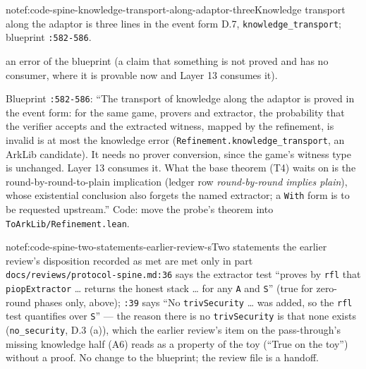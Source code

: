 \begin{finding}{note}{f:code-spine-knowledge-transport-along-adaptor-three}{Knowledge transport along the adaptor is three lines in the event form}
D.7, \texttt{knowledge\_\allowbreak{}transport}; blueprint \texttt{:582-{}586}.

an error of the blueprint (a claim that something is not proved and has no consumer, where it is provable now and Layer 13 consumes it).

Blueprint \texttt{:582-{}586}: \enquote{The transport of knowledge along the adaptor is proved in the event form: for the same game, provers and extractor, the probability that the verifier accepts and the extracted witness, mapped by the refinement, is invalid is at most the knowledge error (\texttt{R\allowbreak{}e\allowbreak{}f\allowbreak{}i\allowbreak{}n\allowbreak{}e\allowbreak{}m\allowbreak{}e\allowbreak{}n\allowbreak{}t\allowbreak{}.\allowbreak{}k\allowbreak{}n\allowbreak{}o\allowbreak{}w\allowbreak{}l\allowbreak{}e\allowbreak{}d\allowbreak{}g\allowbreak{}e\allowbreak{}\_\allowbreak{}t\allowbreak{}r\allowbreak{}a\allowbreak{}n\allowbreak{}s\allowbreak{}p\allowbreak{}o\allowbreak{}r\allowbreak{}t}, an ArkLib candidate). It needs no prover conversion, since the game's witness type is unchanged. Layer 13 consumes it. What the base theorem (T4) waits on is the round-by-round-to-plain implication (ledger row \emph{round-by-round implies plain}), whose existential conclusion also forgets the named extractor; a \texttt{With} form is to be requested upstream.} Code: move the probe's theorem into \texttt{ToArkLib/\allowbreak{}Refinement.\allowbreak{}lean}.

\end{finding}

\begin{finding}{note}{f:code-spine-two-statements-earlier-review-s}{Two statements the earlier review's disposition recorded as met are met only in part}
\texttt{d\allowbreak{}o\allowbreak{}c\allowbreak{}s\allowbreak{}/\allowbreak{}r\allowbreak{}e\allowbreak{}v\allowbreak{}i\allowbreak{}e\allowbreak{}w\allowbreak{}s\allowbreak{}/\allowbreak{}p\allowbreak{}r\allowbreak{}o\allowbreak{}t\allowbreak{}o\allowbreak{}c\allowbreak{}o\allowbreak{}l\allowbreak{}-{}\allowbreak{}s\allowbreak{}p\allowbreak{}i\allowbreak{}n\allowbreak{}e\allowbreak{}.\allowbreak{}m\allowbreak{}d\allowbreak{}:\allowbreak{}3\allowbreak{}6} says the extractor test \enquote{proves by \texttt{rfl} that \texttt{piopExtractor} … returns the honest stack … for any \texttt{A} and \texttt{S}} (true for zero-round phases only, above); \texttt{:39} says \enquote{No \texttt{trivSecurity} … was added, so the \texttt{rfl} test quantifies over \texttt{S}} — the reason there is no \texttt{trivSecurity} is that none exists (\texttt{no\_\allowbreak{}security}, D.3 (a)), which the earlier review's item on the pass-through's missing knowledge half (A6) reads as a property of the toy (\enquote{True on the toy}) without a proof. No change to the blueprint; the review file is a handoff.

\end{finding}

